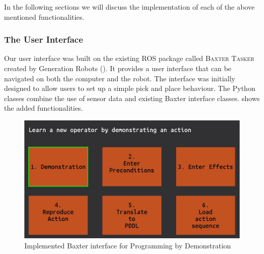 In the following sections we will discuss the implementation of each of the above mentioned functionalities.

\subsubsection{The User Interface}
Our user interface was built on the existing ROS package called \textsc{Baxter Tasker} created by Generation Robots (\cite{BaxterTasker}).
It provides a user interface that can be navigated on both the computer and the robot.
The interface was initially designed to allow users to set up a simple pick and place behaviour.
The Python classes combine the use of sensor data and existing Baxter interface classes.
 shows the added functionalities.

\begin{figure}[h]
	\centering
	\includegraphics[scale=0.5]{figures/interface}
	\caption{Implemented Baxter interface for Programming by Demonstration}
	\label{fig:interface}
\end{figure}


